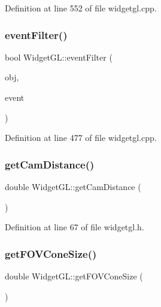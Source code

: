 Definition at line 552 of file widgetgl.\+cpp.

\mbox{\label{class_widget_g_l_a1e4a647889fe682f687bf307ba67b7b0}} 
\subsubsection{\texorpdfstring{eventFilter()}{eventFilter()}}
{\footnotesize\ttfamily bool Widget\+G\+L\+::event\+Filter (\begin{DoxyParamCaption}\item[{Q\+Object $\ast$}]{obj,  }\item[{Q\+Event $\ast$}]{event }\end{DoxyParamCaption})\hspace{0.3cm}{\ttfamily [protected]}}



Definition at line 477 of file widgetgl.\+cpp.

\mbox{\label{class_widget_g_l_a5cdf465d4d043f81340951bf8239f40b}} 
\subsubsection{\texorpdfstring{getCamDistance()}{getCamDistance()}}
{\footnotesize\ttfamily double Widget\+G\+L\+::get\+Cam\+Distance (\begin{DoxyParamCaption}{ }\end{DoxyParamCaption})\hspace{0.3cm}{\ttfamily [inline]}}



Definition at line 67 of file widgetgl.\+h.

\mbox{\label{class_widget_g_l_a2331297c0ae23706e09a8210c8e8aa8d}} 
\subsubsection{\texorpdfstring{getFOVConeSize()}{getFOVConeSize()}}
{\footnotesize\ttfamily double Widget\+G\+L\+::get\+F\+O\+V\+Cone\+Size (\begin{DoxyParamCaption}{ }\end{DoxyParamCaption})\hspace{0.3cm}{\ttfamily [inline]}}



